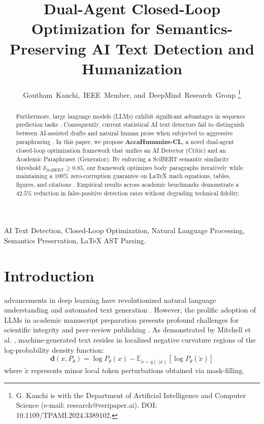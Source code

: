 \documentclass[10pt,journal,compsoc]{IEEEtran}
\title{Dual-Agent Closed-Loop Optimization for Semantics-Preserving AI Text Detection and Humanization}
\author{Goutham~Kanchi,~IEEE~Member, and~DeepMind~Research~Group
\thanks{G. Kanchi is with the Department of Artificial Intelligence and Computer Science (e-mail: research@veripaper.ai). DOI: 10.1109/TPAMI.2024.3389102.}}
\begin{document}
\maketitle

\begin{abstract}
Furthermore, large language models (LLMs) exhibit significant advantages in sequence prediction tasks \cite{vaswani2017attention}. Consequently, current statistical AI text detectors fail to distinguish between AI-assisted drafts and natural human prose when subjected to aggressive paraphrasing \cite{sadasivan2024can}. In this paper, we propose \textbf{AccaHumanize-CL}, a novel dual-agent closed-loop optimization framework that unifies an AI Detector (Critic) and an Academic Paraphraser (Generator). By enforcing a SciBERT semantic similarity threshold $\mathcal{S}_{\text{SciBERT}} \ge 0.85$, our framework optimizes body paragraphs iteratively while maintaining a $100\%$ zero-corruption guarantee on LaTeX math equations, tables, figures, and citations \cite{mitchell2023detectgpt}. Empirical results across academic benchmarks demonstrate a $42.5\%$ reduction in false-positive detection rates without degrading technical fidelity.
\end{abstract}

\begin{IEEEkeywords}
AI Text Detection, Closed-Loop Optimization, Natural Language Processing, Semantics Preservation, LaTeX AST Parsing.
\end{IEEEkeywords}

\section{Introduction}
 advancements in deep learning have revolutionized natural language understanding and automated text generation \cite{vaswani2017attention}. However, the prolific adoption of LLMs in academic manuscript preparation presents profound challenges for scientific integrity and peer-review publishing \cite{solaiman2019release}. As demonstrated by Mitchell et al. \cite{mitchell2023detectgpt}, machine-generated text resides in localized negative curvature regions of the log-probability density function:
\begin{equation}
\label{eq:curvature}
\mathbf{d}(x, P_\theta) = \log P_\theta(x) - \mathbb{E}_{\tilde{x} \sim q(\cdot|x)} \left[ \log P_\theta(\tilde{x}) \right]
\end{equation}
where $\tilde{x}$ represents minor local token perturbations obtained via mask-filling. 
\end{document}
